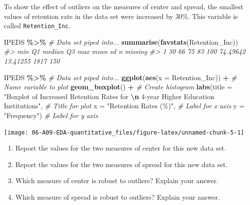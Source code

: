 \documentclass[
]{report}
\newenvironment{Shaded}{\begin{snugshade}}{\end{snugshade}}
\newcommand{\AttributeTok}[1]{\textcolor[rgb]{0.13,0.29,0.53}{#1}}
\newcommand{\CommentTok}[1]{\textcolor[rgb]{0.56,0.35,0.01}{\textit{#1}}}
\newcommand{\FunctionTok}[1]{\textcolor[rgb]{0.13,0.29,0.53}{\textbf{#1}}}
\newcommand{\NormalTok}[1]{#1}
\newcommand{\SpecialCharTok}[1]{\textcolor[rgb]{0.81,0.36,0.00}{\textbf{#1}}}
\newcommand{\StringTok}[1]{\textcolor[rgb]{0.31,0.60,0.02}{#1}}
\begin{document}
\vspace{0.5in}

To show the effect of outliers on the measures of center and spread, the smallest values of retention rate in the
data set were increased by 30\%. This variable is called \texttt{Retention\_Inc}.

\begin{Shaded}
\begin{Highlighting}[]
\NormalTok{IPEDS }\SpecialCharTok{\%\textgreater{}\%} \CommentTok{\# Data set piped into...}
    \FunctionTok{summarise}\NormalTok{(}\FunctionTok{favstats}\NormalTok{(Retention\_Inc))}
\CommentTok{\#\textgreater{}   min Q1 median Q3 max     mean       sd    n missing}
\CommentTok{\#\textgreater{} 1  30 66     75 83 100 74.49642 13.41255 1817     150}

\NormalTok{IPEDS }\SpecialCharTok{\%\textgreater{}\%} \CommentTok{\# Data set piped into...}
    \FunctionTok{ggplot}\NormalTok{(}\FunctionTok{aes}\NormalTok{(}\AttributeTok{x =}\NormalTok{ Retention\_Inc)) }\SpecialCharTok{+} \CommentTok{\# Name variable to plot}
    \FunctionTok{geom\_boxplot}\NormalTok{() }\SpecialCharTok{+} \CommentTok{\# Create histogram }
    \FunctionTok{labs}\NormalTok{(}\AttributeTok{title =} \StringTok{"Boxplot of Increased Retention Rates for }\SpecialCharTok{\textbackslash{}n}\StringTok{ 4{-}year Higher Education Institutions"}\NormalTok{, }
        \CommentTok{\# Title for plot}
        \AttributeTok{x =} \StringTok{"Retention Rates (\%)"}\NormalTok{, }\CommentTok{\# Label for x axis}
        \AttributeTok{y =} \StringTok{"Frequency"}\NormalTok{) }\CommentTok{\# Label for y axis}
\end{Highlighting}
\end{Shaded}

\begin{center}\texttt{[image: 06-A09-EDA-quantitative\_files/figure-latex/unnamed-chunk-5-1]} \end{center}

\begin{enumerate}
\def\labelenumi{\arabic{enumi}.}
\setcounter{enumi}{6}
\item
  Report the values for the two measures of center for this new data set.
  \vspace{0.5in}
\item
  Report the values for the two measures of spread for this new data set.
  \vspace{0.5in}
\item
  Which measure of center is robust to outliers? Explain your answer.
  \vspace{0.8in}
\item
  Which measure of spread is robust to outliers? Explain your answer.
  \vspace{0.8in}
\end{enumerate}
\end{document}
